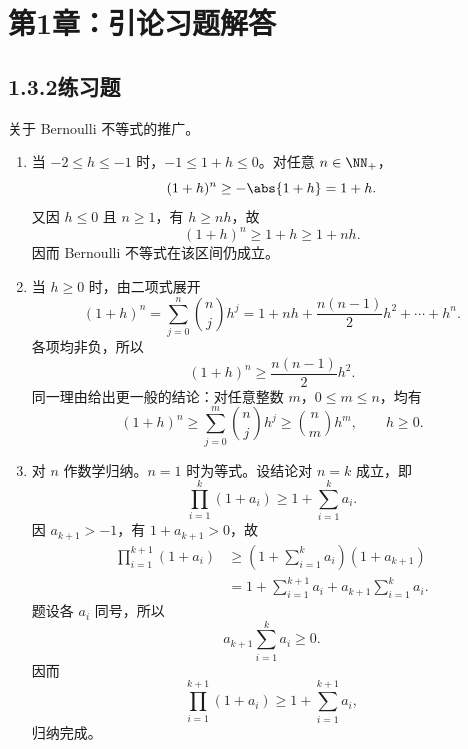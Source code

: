 
\chapter*{第1章：引论习题解答}
\section*{1.3.2\quad 练习题}

\begin{xexercise}[1]
关于 Bernoulli 不等式的推广。
\end{xexercise}
\begin{xsolution}
\begin{enumerate}[label=(\arabic*)]
  \item 当 $-2\le h\le-1$ 时，$-1\le1+h\le0$。对任意 $n\in\NN_+$，
  \[
    (1+h)^n\ge-\abs{1+h}=1+h.
  \]
  又因 $h\le0$ 且 $n\ge1$，有 $h\ge nh$，故
  \[
    (1+h)^n\ge1+h\ge1+nh.
  \]
  因而 Bernoulli 不等式在该区间仍成立。

  \item 当 $h\ge0$ 时，由二项式展开
  \[
    (1+h)^n
    =\sum_{j=0}^n\binom{n}{j}h^j
    =1+nh+\frac{n(n-1)}2h^2+\cdots+h^n.
  \]
  各项均非负，所以
  \[
    (1+h)^n\ge\frac{n(n-1)}2h^2.
  \]
  同一理由给出更一般的结论：对任意整数 $m$，$0\le m\le n$，均有
  \[
    (1+h)^n\ge\sum_{j=0}^m\binom{n}{j}h^j
    \ge\binom{n}{m}h^m,
    \qquad h\ge0.
  \]

  \item 对 $n$ 作数学归纳。$n=1$ 时为等式。设结论对 $n=k$ 成立，即
  \[
    \prod_{i=1}^k(1+a_i)\ge1+\sum_{i=1}^k a_i.
  \]
  因 $a_{k+1}>-1$，有 $1+a_{k+1}>0$，故
  \[
  \begin{aligned}
    \prod_{i=1}^{k+1}(1+a_i)
    &\ge\left(1+\sum_{i=1}^k a_i\right)(1+a_{k+1})\\
    &=1+\sum_{i=1}^{k+1}a_i
      +a_{k+1}\sum_{i=1}^k a_i.
  \end{aligned}
  \]
  题设各 $a_i$ 同号，所以
  \[
    a_{k+1}\sum_{i=1}^k a_i\ge0.
  \]
  因而
  \[
    \prod_{i=1}^{k+1}(1+a_i)\ge1+\sum_{i=1}^{k+1}a_i,
  \]
  归纳完成。
\end{enumerate}
\end{xsolution}

